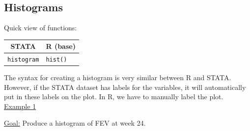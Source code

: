 \documentclass[landscape]{article}
\begin{document}
\subsection{Histograms}
Quick view of functions:\\
\begin{tabular}{c|l}
STATA & R (base) \\
\hline
\texttt{histogram} & \texttt{hist()}
\end{tabular}

The syntax for creating a histogram is very similar between R and STATA. However, if the STATA dataset has labels for the variables, it will automatically put in these labels on the plot. In R, we have to manually label the plot.
\newline
\noindent \underline{Example 1}

\underline{Goal:} Produce a histogram of FEV at week 24.
\end{document}
